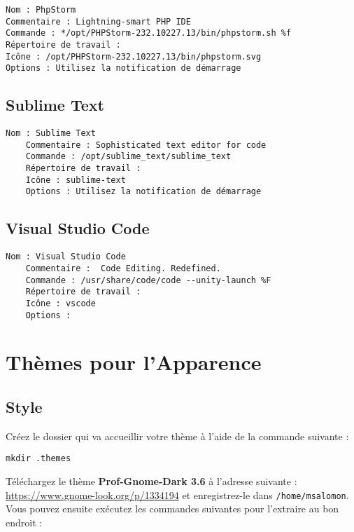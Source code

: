\begin{lstlisting}[style=tf]
Nom : PhpStorm
Commentaire : Lightning-smart PHP IDE
Commande : */opt/PHPStorm-232.10227.13/bin/phpstorm.sh %f
Répertoire de travail :
Icône : /opt/PHPStorm-232.10227.13/bin/phpstorm.svg
Options : Utilisez la notification de démarrage
\end{lstlisting}

\subsection{Sublime Text}

\begin{lstlisting}[style=tf]
	Nom : Sublime Text
	Commentaire : Sophisticated text editor for code
	Commande : /opt/sublime_text/sublime_text
	Répertoire de travail :
	Icône : sublime-text
	Options : Utilisez la notification de démarrage
\end{lstlisting}

\subsection{Visual Studio Code}

\begin{lstlisting}[style=tf]
	Nom : Visual Studio Code
	Commentaire :  Code Editing. Redefined.
	Commande : /usr/share/code/code --unity-launch %F
	Répertoire de travail :
	Icône : vscode
	Options :
\end{lstlisting}

\section{Thèmes pour l'Apparence}

\subsection{Style}

Créez le dossier qui va accueillir votre thème à l'aide de la commande suivante :

\begin{lstlisting}
mkdir .themes
\end{lstlisting}

Téléchargez le thème \textbf{Prof-Gnome-Dark 3.6} à l'adresse suivante : \href{https://www.gnome-look.org/p/1334194}{https://www.gnome-look.org/p/1334194} et enregistrez-le dans \texttt{/home/msalomon}. Vous pouvez ensuite exécutez les commandes suivantes pour l'extraire au bon endroit :

